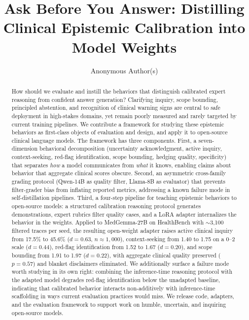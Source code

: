 \documentclass{article}
\title{Ask Before You Answer: Distilling Clinical Epistemic Calibration into Model Weights}
\author{Anonymous Author(s)}
\begin{document}
\raggedbottom

\maketitle

\begin{abstract}
How should we evaluate and instill the behaviors that distinguish calibrated expert reasoning from confident answer generation? Clarifying inquiry, scope bounding, principled abstention, and recognition of clinical warning signs are central to safe deployment in high-stakes domains, yet remain poorly measured and rarely targeted by current training pipelines. We contribute a framework for studying these epistemic behaviors as first-class objects of evaluation and design, and apply it to open-source clinical language models. The framework has three components. First, a seven-dimension behavioral decomposition (uncertainty acknowledgment, active inquiry, context-seeking, red-flag identification, scope bounding, hedging quality, specificity) that separates \emph{how} a model communicates from \emph{what} it knows, enabling claims about behavior that aggregate clinical scores obscure. Second, an asymmetric cross-family grading protocol (Qwen-14B as quality filter, Llama-8B as evaluator) that prevents filter-grader bias from inflating reported metrics, addressing a known failure mode in self-distillation pipelines. Third, a four-step pipeline for teaching epistemic behaviors to open-source models: a structured calibration reasoning protocol generates demonstrations, expert rubrics filter quality cases, and a LoRA adapter internalizes the behavior in the weights. Applied to MedGemma-27B on HealthBench with ${\sim}$3,100 filtered traces per seed, the resulting open-weight adapter raises active clinical inquiry from 17.5\% to 45.6\% ($d{=}0.63$, $n{\approx}1{,}000$), context-seeking from 1.40 to 1.75 on a 0--2 scale ($d{=}0.44$), red-flag identification from 1.52 to 1.67 ($d{=}0.20$), and scope bounding from 1.91 to 1.97 ($d{=}0.22$), with aggregate clinical quality preserved ($p{=}0.57$) and blanket disclaimers eliminated. We additionally surface a failure mode worth studying in its own right: combining the inference-time reasoning protocol with the adapted model degrades red-flag identification below the unadapted baseline, indicating that calibrated behavior interacts non-additively with inference-time scaffolding in ways current evaluation practices would miss. We release code, adapters, and the evaluation framework to support work on humble, uncertain, and inquiring open-source models.
\end{abstract}
\end{document}
